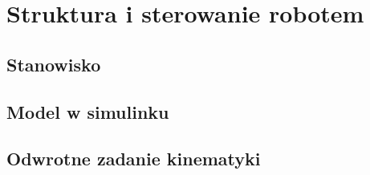 \chapter{Struktura i sterowanie robotem}
\label{cha:strukturaISterowanie}

\section{Stanowisko}
\label{sec:stanowisko}

\section{Model w simulinku}
\label{sec:modelWSimulinku}

\section{Odwrotne zadanie kinematyki}
\label{sec:odwrotneZadanieKinematyki}